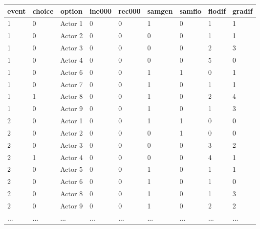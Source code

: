 \begin{table}[!tbp]
\begin{center}
\begin{tabular}{lllllllll}
\hline\hline
\multicolumn{1}{c}{event}&\multicolumn{1}{c}{choice}&\multicolumn{1}{c}{option}&\multicolumn{1}{c}{ine000}&\multicolumn{1}{c}{rec000}&\multicolumn{1}{c}{samgen}&\multicolumn{1}{c}{samflo}&\multicolumn{1}{c}{flodif}&\multicolumn{1}{c}{gradif}\tabularnewline
\hline
1&0&Actor 1&0&0&1&0&1&1\tabularnewline
1&0&Actor 2&0&0&0&0&1&1\tabularnewline
1&0&Actor 3&0&0&0&0&2&3\tabularnewline
1&0&Actor 4&0&0&0&0&5&0\tabularnewline
1&0&Actor 6&0&0&1&1&0&1\tabularnewline
1&0&Actor 7&0&0&1&0&1&1\tabularnewline
1&1&Actor 8&0&0&1&0&2&4\tabularnewline
1&0&Actor 9&0&0&1&0&1&3\tabularnewline
2&0&Actor 1&0&0&1&1&0&0\tabularnewline
2&0&Actor 2&0&0&0&1&0&0\tabularnewline
2&0&Actor 3&0&0&0&0&3&2\tabularnewline
2&1&Actor 4&0&0&0&0&4&1\tabularnewline
2&0&Actor 5&0&0&1&0&1&1\tabularnewline
2&0&Actor 6&0&0&1&0&1&0\tabularnewline
2&0&Actor 8&0&0&1&0&1&3\tabularnewline
2&0&Actor 9&0&0&1&0&2&2\tabularnewline
...&...&...&...&...&...&...&...&...\tabularnewline
\hline
\end{tabular}\end{center}
\end{table}
